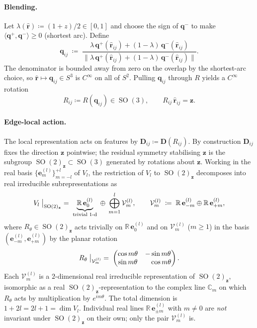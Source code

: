 \documentclass[11pt,a4paper]{article}
\DeclareMathOperator{\SO}{SO}
\newcommand{\R}{\mathbb{R}}
\newcommand{\C}{\mathbb{C}}
\newcommand{\Sph}{S^2}
\newcommand{\brh}{\hat{\bm{r}}}
\newcommand{\bz}{\bm{z}}
\newcommand{\bq}{\bm{q}}
\newcommand{\bD}{\bm{D}}
\theoremstyle{plain}
\theoremstyle{definition}
\theoremstyle{remark}
\begin{document}
\paragraph{Blending.}
Let $\lambda(\brh)\coloneqq(1+z)/2\in[0,1]$ and choose the sign of $\bq^{-}$ to
make $\langle\bq^{+},\bq^{-}\rangle\geq 0$ (shortest arc). Define
\begin{equation}\label{eq:nlerp}
    \bq_{ij} \;\coloneqq\; \frac{\lambda\,\bq^{+}(\brh_{ij}) + (1-\lambda)\,\bq^{-}(\brh_{ij})}{\bigl\|\lambda\,\bq^{+}(\brh_{ij}) + (1-\lambda)\,\bq^{-}(\brh_{ij})\bigr\|}.
\end{equation}
The denominator is bounded away from zero on the overlap by the shortest-arc choice, so $\brh\mapsto\bq_{ij}\in S^3$ is $C^\infty$ on all of $\Sph$.
Pulling $\bq_{ij}$ through $R$ yields a $C^\infty$ rotation
\begin{equation}
    R_{ij}\coloneqq R(\bq_{ij})\in\SO(3),\qquad R_{ij}\,\brh_{ij}=\bz.
\end{equation}

\paragraph{Edge-local action.}
The local representation acts on features by $\bD_{ij}\coloneqq\bD(R_{ij})$. By
construction $\bD_{ij}$ fixes the direction $\bz$ pointwise; the residual
symmetry stabilising $\bz$ is the subgroup $\SO(2)_{\bz}\subset\SO(3)$
generated by rotations about $\bz$. Working in the real basis
$\{\mathbf{e}_m^{(l)}\}_{m=-l}^{+l}$ of $V_l$, the restriction of $V_l$ to
$\SO(2)_{\bz}$ decomposes into real irreducible subrepresentations as
\begin{equation}\label{eq:so2decomp}
    V_l\bigm|_{\SO(2)_{\bz}}\;=\;
    \underbrace{\R\,\mathbf{e}_0^{(l)}}_{\text{trivial $1$-d}}
    \;\oplus\;\bigoplus_{m=1}^{l}\mathcal{V}_m^{(l)},
    \qquad
    \mathcal{V}_m^{(l)}\;\coloneqq\;\R\,\mathbf{e}_{-m}^{(l)}\oplus\R\,\mathbf{e}_{+m}^{(l)},
\end{equation}
where $R_\theta\in\SO(2)_{\bz}$ acts trivially on $\R\,\mathbf{e}_0^{(l)}$ and on $\mathcal{V}_m^{(l)}$ ($m\geq 1$) in the basis $(\mathbf{e}_{-m}^{(l)},\mathbf{e}_{+m}^{(l)})$ by the planar rotation
\begin{equation}\label{eq:so2-rot}
    R_\theta\bigm|_{\mathcal{V}_m^{(l)}}\;=\;\begin{pmatrix}\cos m\theta & -\sin m\theta\\ \sin m\theta & \phantom{-}\cos m\theta\end{pmatrix}.
\end{equation}
Each $\mathcal{V}_m^{(l)}$ is a $2$-dimensional real irreducible representation of $\SO(2)_{\bz}$, isomorphic as a real $\SO(2)_{\bz}$-representation to the complex line $\C_m$ on which $R_\theta$ acts by multiplication by $e^{im\theta}$.
The total dimension is $1+2l=2l+1=\dim V_l$.
Individual real lines $\R\,\mathbf{e}_{\pm m}^{(l)}$ with $m\neq 0$ are \emph{not} invariant under $\SO(2)_{\bz}$ on their own; only the pair $\mathcal{V}_m^{(l)}$ is.
\end{document}
